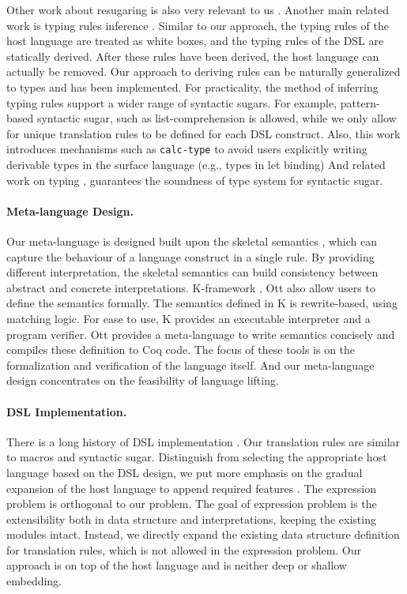 Other work about resugaring is also very relevant to us \cite{infer-scope,lazy-desg}.
Another main related work is typing rules inference \cite{infer-types}.
Similar to our approach, the typing rules of the host language are treated as white boxes, and the typing rules of the DSL are statically derived.
After these rules have been derived, the host language can actually be removed.
Our approach to deriving rules can be naturally generalized to types and has been implemented.
For practicality, the method of inferring typing rules support a wider range of syntactic sugars.
For example, pattern-based syntactic sugar, such as list-comprehension is allowed,
 while we only allow for unique translation rules to be defined for each DSL construct.
Also, this work introduces mechanisms such as \texttt{calc-type} to avoid users explicitly writing derivable types in the surface language (e.g., types in let binding)
And related work on typing \cite{type-sound,type-sound-1}, guarantees the soundness of type system for syntactic sugar.

\paragraph{Meta-language Design.}
Our meta-language is designed built upon the skeletal semantics \cite{skeleton},
 which can capture the behaviour of a language construct in a single rule.
By providing different interpretation,
 the skeletal semantics can build consistency between abstract and concrete interpretations.
K-framework \cite{K-framework}, Ott \cite{Ott} also allow users to define the semantics formally.
The semantics defined in K is rewrite-based, using matching logic.
For ease to use, K provides an executable interpreter and a program verifier.
Ott provides a meta-language to write semantics concisely and compiles these definition to Coq code.
The focus of these tools is on the formalization and verification of the language itself.
And our meta-language design concentrates on the feasibility of language lifting.

\paragraph{DSL Implementation.}
There is a long history of DSL implementation \cite{MartinDSL,when-how-dsl}.
Our translation rules are similar to macros and syntactic sugar.
Distinguish from selecting the appropriate host language based on the DSL design,
 we put more emphasis on the gradual expansion of the host language to append required features \cite{MoggiMeta}.
The expression problem \cite{expr-problem} is orthogonal to our problem.
The goal of expression problem is the extensibility both in data structure and interpretations,
 keeping the existing modules intact.
Instead, we directly expand the existing data structure definition for translation rules,
 which is not allowed in the expression problem.
Our approach is on top of the host language and is neither deep or shallow embedding.
